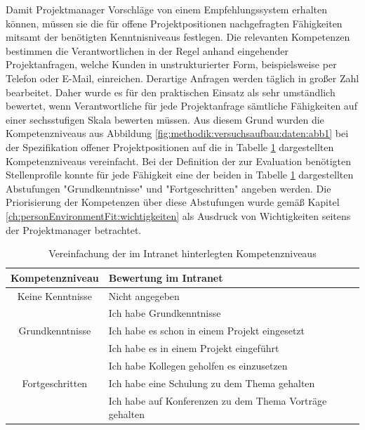 Damit Projektmanager Vorschläge von einem Empfehlungssystem erhalten können, müssen sie die für offene Projektpositionen nachgefragten Fähigkeiten mitsamt der benötigten Kenntnisniveaus festlegen. Die relevanten Kompetenzen bestimmen die Verantwortlichen in der Regel anhand eingehender Projektanfragen, welche Kunden in unstrukturierter Form, beispielsweise per Telefon oder E-Mail, einreichen. Derartige Anfragen werden täglich in großer Zahl bearbeitet. Daher wurde es für den praktischen Einsatz als sehr umständlich bewertet, wenn Verantwortliche für jede Projektanfrage sämtliche Fähigkeiten auf einer sechsstufigen Skala bewerten müssen. Aus diesem Grund wurden die Kompetenzniveaus aus Abbildung \ref{fig:methodik:versuchsaufbau:daten:abb1} bei der Spezifikation offener Projektpositionen auf die in Tabelle \ref{tbl:methodik:versuchsaufbau:systemarchitektur:matrixservice:tbl1} dargestellten Kompetenzniveaus vereinfacht. Bei der Definition der zur Evaluation benötigten Stellenprofile konnte für jede Fähigkeit eine der beiden in Tabelle \ref{tbl:methodik:versuchsaufbau:systemarchitektur:matrixservice:tbl1} dargestellten Abstufungen "Grundkenntnisse" und "Fortgeschritten" angeben werden. Die Priorisierung der Kompetenzen über diese Abstufungen wurde gemäß Kapitel \ref{ch:personEnvironmentFit:wichtigkeiten} als Ausdruck von Wichtigkeiten seitens der Projektmanager betrachtet.

\begin{table}[h]
	\centering
	\begin{tabularx}{\textwidth}{c|X}
		\textbf{Kompetenzniveau} & \textbf{Bewertung im Intranet}\\
		\hline
		Keine Kenntnisse & Nicht angegeben\\
		\hline
		& Ich habe Grundkenntnisse\\
		Grundkenntnisse & Ich habe es schon in einem Projekt eingesetzt\\
		& Ich habe es in einem Projekt eingeführt\\
		\hline
		& Ich habe Kollegen geholfen es einzusetzen\\
		Fortgeschritten & Ich habe eine Schulung zu dem Thema gehalten\\
		& Ich habe auf Konferenzen zu dem Thema Vorträge gehalten\\
		\hline
	\end{tabularx}
	\caption{Vereinfachung der im Intranet hinterlegten Kompetenzniveaus}
	\label{tbl:methodik:versuchsaufbau:systemarchitektur:matrixservice:tbl1}
\end{table}

